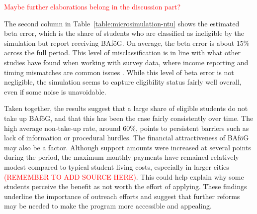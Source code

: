 \textcolor{red}{Maybe further elaborations belong in the discussion part?}

The second column in Table~\ref{table:microsimulation-ntu} shows the estimated beta error, which is the share of students who are classified as ineligible by the simulation but report receiving BAföG. On average, the beta error is about 15\% across the full period. This level of misclassification is in line with what other studies have found when working with survey data, where income reporting and timing mismatches are common issues \citep{frick_claim_2007}. While this level of beta error is not negligible, the simulation seems to capture eligibility status fairly well overall, even if some noise is unavoidable.

Taken together, the results suggest that a large share of eligible students do not take up BAföG, and that this has been the case fairly consistently over time. The high average non-take-up rate, around 60\%, points to persistent barriers such as lack of information or procedural hurdles. The financial attractiveness of BAföG may also be a factor. Although support amounts were increased at several points during the period, the maximum monthly payments have remained relatively modest compared to typical student living costs, especially in larger cities \textcolor{red}{(REMEMBER TO ADD SOURCE HERE)}. This could help explain why some students perceive the benefit as not worth the effort of applying. These findings underline the importance of outreach efforts and suggest that further reforms may be needed to make the program more accessible and appealing.


